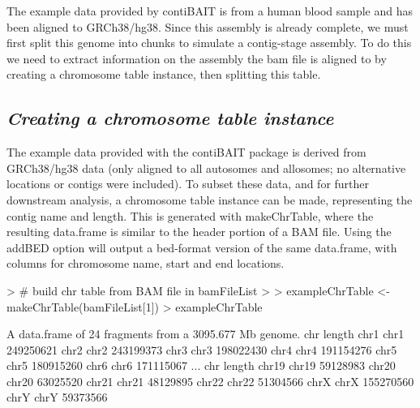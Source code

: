 \documentclass{article}
\begin{document}
\begin{Schunk}
\end{Schunk}

The example data provided by contiBAIT is from a human blood sample and has been aligned to GRCh38/hg38.  Since this assembly is already complete, we must first split this genome into chunks to simulate a contig-stage assembly. To do this we need to extract information on the assembly the bam file is aligned to by creating a chromosome table instance, then splitting this table.

\subsection{\textit{Creating a chromosome table instance}}

The example data provided with the contiBAIT package is derived from GRCh38/hg38 data (only aligned to all autosomes and allosomes; no alternative locations or contigs were included). To subset these data, and for further downstream analysis, a chromosome table instance can be made, representing the contig name and length. This is generated with makeChrTable, where the resulting data.frame is similar to the header portion of a BAM file.  Using the addBED option will output a bed-format version of the same data.frame, with columns for chromosome name, start and end locations. 

\begin{Schunk}
\begin{Sinput}
> # build chr table from BAM file in bamFileList
> 
> exampleChrTable <- makeChrTable(bamFileList[1]) 
> exampleChrTable
\end{Sinput}
\begin{Soutput}
A data.frame of 24 fragments from a 3095.677 Mb genome.
      chr    length
chr1 chr1 249250621
chr2 chr2 243199373
chr3 chr3 198022430
chr4 chr4 191154276
chr5 chr5 180915260
chr6 chr6 171115067
...
        chr    length
chr19 chr19  59128983
chr20 chr20  63025520
chr21 chr21  48129895
chr22 chr22  51304566
chrX   chrX 155270560
chrY   chrY  59373566
\end{Soutput}
\end{Schunk}
\end{document}
